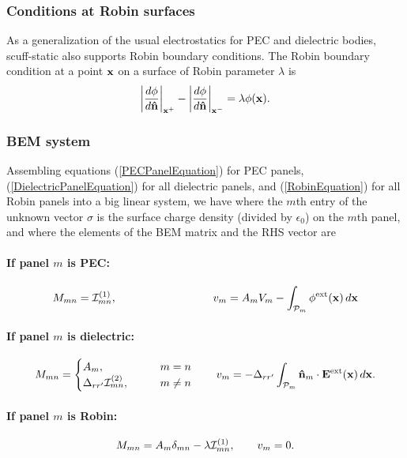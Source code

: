 \documentclass[letterpaper]{article}
\begin{document}
\subsubsection*{Conditions at Robin surfaces}

As a generalization of the usual electrostatics
for PEC and dielectric bodies, {\sc scuff-static} 
also supports Robin boundary conditions.
The Robin boundary condition at a point $\mathbf{x}$
on a surface of Robin parameter $\lambda$ is 
$$  \left|\frac{d\phi}{d\mathbf{\hat n}}\right|_{\mathbf{x}^+} 
   -\left|\frac{d\phi}{d\mathbf{\hat n}}\right|_{\mathbf{x}^-} 
   =\lambda \phi(\mathbf{x}).
$$

\subsubsection*{BEM system}

Assembling equations (\ref{PECPanelEquation}) for PEC panels,
(\ref{DielectricPanelEquation}) for all dielectric panels,
and (\ref{RobinEquation}) for all Robin panels 
into a big linear system, we have 
where the $m$th entry of the unknown vector $\sigma$ is the 
surface charge density (divided by $\epsilon_0$) on the $m$th
panel, and where the elements of the BEM matrix and the RHS vector are
\paragraph{If panel $m$ is PEC:}
$$
  M_{mn} = \mathcal{I}^{\hbox{\scriptsize{(1)}}}_{mn}, 
   \hspace{1.2in}
   v_m = A_{m} V_m - \int_{\mathcal{P}_m} \phi^{\hbox{\scriptsize{ext}}}(\mathbf{x}) \, d\mathbf{x}
$$
\paragraph{If panel $m$ is dielectric:}
$$ M_{mn} = 
   \begin{cases} 
     A_m, \qquad &m=n \\
     \Delta_{rr^\prime} \mathcal{I}^{\hbox{\scriptsize{(2)}}}_{mn}, \qquad &m\ne n
   \end{cases} 
   \qquad 
   v_m = -\Delta_{rr^\prime} \int_{\mathcal{P}_m} \mathbf{\hat n}_m \cdot \mathbf{E}^{\hbox{\scriptsize{ext}}}(\mathbf{x}) \, d\mathbf{x}.
$$
\paragraph{If panel $m$ is Robin:}
$$ M_{mn} = 
     A_{m}\delta_{mn} - \lambda \mathcal{I}^{\hbox{\scriptsize{(1)}}}_{mn},
   \qquad 
   v_m = 0.
$$
\end{document}
